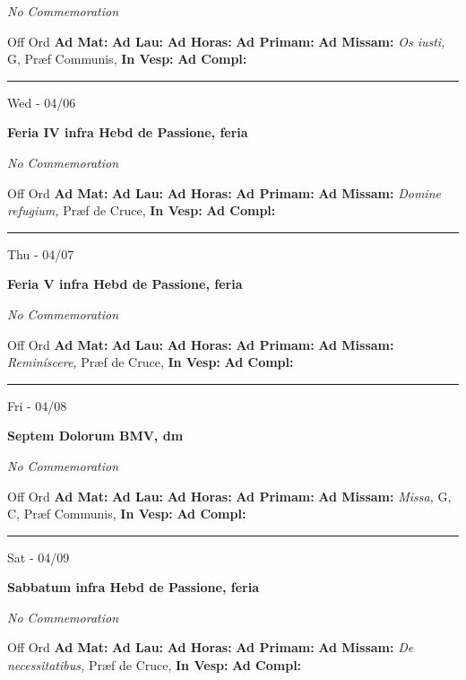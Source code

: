 \documentclass[letterpaper, 10pt]{article}
\begin{document}
\textit{No Commemoration}\begin{justify}
Off Ord
\textbf{Ad Mat: }
\textbf{Ad Lau: }
\textbf{Ad Horas: }
\textbf{Ad Primam: }
\textbf{Ad Missam:} \textit{Os iusti, } G, Præf Communis, 
\textbf{In Vesp: }
\textbf{Ad Compl: }\end{justify}



\hrule
\begin{center}
Wed - 04/06
\end{center}\textbf{ \large Feria IV infra Hebd de Passione, \textnormal{\normalsize feria}}

\textit{No Commemoration}\begin{justify}
Off Ord
\textbf{Ad Mat: }
\textbf{Ad Lau: }
\textbf{Ad Horas: }
\textbf{Ad Primam: }
\textbf{Ad Missam:} \textit{Domine refugium, } Præf de Cruce, 
\textbf{In Vesp: }
\textbf{Ad Compl: }\end{justify}



\hrule
\begin{center}
Thu - 04/07
\end{center}\textbf{ \large Feria V infra Hebd de Passione, \textnormal{\normalsize feria}}

\textit{No Commemoration}\begin{justify}
Off Ord
\textbf{Ad Mat: }
\textbf{Ad Lau: }
\textbf{Ad Horas: }
\textbf{Ad Primam: }
\textbf{Ad Missam:} \textit{Reminíscere, } Præf de Cruce, 
\textbf{In Vesp: }
\textbf{Ad Compl: }\end{justify}



\hrule
\begin{center}
Fri - 04/08
\end{center}\textbf{ \large Septem Dolorum BMV, \textnormal{\normalsize dm}}

\textit{No Commemoration}\begin{justify}
Off Ord
\textbf{Ad Mat: }
\textbf{Ad Lau: }
\textbf{Ad Horas: }
\textbf{Ad Primam: }
\textbf{Ad Missam:} \textit{Missa, } G, C, Præf Communis, 
\textbf{In Vesp: }
\textbf{Ad Compl: }\end{justify}



\hrule
\begin{center}
Sat - 04/09
\end{center}\textbf{ \large Sabbatum infra Hebd de Passione, \textnormal{\normalsize feria}}

\textit{No Commemoration}\begin{justify}
Off Ord
\textbf{Ad Mat: }
\textbf{Ad Lau: }
\textbf{Ad Horas: }
\textbf{Ad Primam: }
\textbf{Ad Missam:} \textit{De necessitatibus, } Præf de Cruce, 
\textbf{In Vesp: }
\textbf{Ad Compl: }\end{justify}
\end{document}
